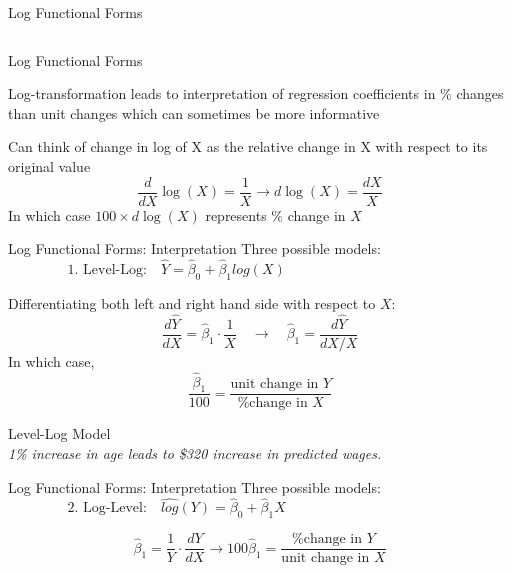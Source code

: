 \documentclass{./../div_teaching_slides}
\begin{document}
\begin{frame}{Log Functional Forms}
\begin{columns}[T]
\begin{column}{0.65\textwidth}
\end{column}	
\end{columns}
\end{frame}

\begin{frame}{Log Functional Forms}
\vspace{-0.5em}
\begin{witemize}
  \item Log-transformation leads to interpretation of regression coefficients in \% changes than unit changes which can sometimes be more informative 
  \item Can think of change in log of X as the relative change in X with respect to its original value
  $$ \frac{d}{dX} \log(X) = \frac{1}{X} \rightarrow d \log(X) = \frac{d X}{X} $$
  In which case $100 \times d\log(X)$ represents \% change in $X$
\end{witemize}
\end{frame}

\begin{frame}{Log Functional Forms: Interpretation}
Three possible models:
$$\text{1. Level-Log:} \quad \hat{Y} = \hat{\beta}_0 +  \hat{\beta}_1 log(X) \hspace{5cm}$$

Differentiating both left and right hand side with respect to $X$:
$$ \frac{d \hat{Y} }{d X} = \hat{\beta}_1 \cdot \frac{1}{X} \quad  \rightarrow  \quad \hat{\beta}_1 = \frac{d \hat{Y} }{d X/X} $$
In which case,
$$ \frac{\hat{\beta}_1}{100} = \frac{\text{unit change in $Y$}}{\text{\% change in $X$}}  $$
\end{frame}

\begin{frame}{Level-Log Model}
\centering \small \vspace{-0.5em}
 \\ \vspace{1.5em}
\normalsize \textit{1\% increase in age leads to \$320 increase in predicted wages.} 
\end{frame}

\begin{frame}{Log Functional Forms: Interpretation}
Three possible models:
$$\text{2. Log-Level:} \quad \hat{log}(Y) = \hat{\beta}_0 +  \hat{\beta}_1 X \hspace{5cm}$$

$$\hat{\beta}_1 = \frac{1}{Y}\cdot \frac{dY}{d X} \rightarrow 100 \hat{\beta}_1 = \frac{\text{\% change in $Y$}}{\text{unit change in $X$}}  $$
\end{frame}
\end{document}
